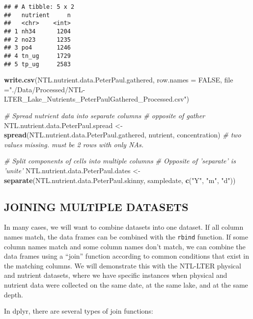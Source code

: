 \documentclass[]{article}
\newenvironment{Shaded}{\begin{snugshade}}{\end{snugshade}}
\newcommand{\KeywordTok}[1]{\textcolor[rgb]{0.13,0.29,0.53}{\textbf{#1}}}
\newcommand{\DataTypeTok}[1]{\textcolor[rgb]{0.13,0.29,0.53}{#1}}
\newcommand{\StringTok}[1]{\textcolor[rgb]{0.31,0.60,0.02}{#1}}
\newcommand{\CommentTok}[1]{\textcolor[rgb]{0.56,0.35,0.01}{\textit{#1}}}
\newcommand{\OtherTok}[1]{\textcolor[rgb]{0.56,0.35,0.01}{#1}}
\newcommand{\NormalTok}[1]{#1}
\begin{document}
\begin{verbatim}
## # A tibble: 5 x 2
##   nutrient     n
##   <chr>    <int>
## 1 nh34      1204
## 2 no23      1235
## 3 po4       1246
## 4 tn_ug     1729
## 5 tp_ug     2583
\end{verbatim}

\begin{Shaded}
\begin{Highlighting}[]
\KeywordTok{write.csv}\NormalTok{(NTL.nutrient.data.PeterPaul.gathered, }\DataTypeTok{row.names =} \OtherTok{FALSE}\NormalTok{, }
          \DataTypeTok{file =}\StringTok{"./Data/Processed/NTL-LTER_Lake_Nutrients_PeterPaulGathered_Processed.csv"}\NormalTok{)}

\CommentTok{# Spread nutrient data into separate columns   # opposite of gather}
\NormalTok{NTL.nutrient.data.PeterPaul.spread <-}\StringTok{ }\KeywordTok{spread}\NormalTok{(NTL.nutrient.data.PeterPaul.gathered, nutrient, concentration) }\CommentTok{# two values missing. must be 2 rows with only NAs.}

\CommentTok{# Split components of cells into multiple columns}
\CommentTok{# Opposite of 'separate' is 'unite'}
\NormalTok{NTL.nutrient.data.PeterPaul.dates <-}\StringTok{ }\KeywordTok{separate}\NormalTok{(NTL.nutrient.data.PeterPaul.skinny, sampledate, }\KeywordTok{c}\NormalTok{(}\StringTok{"Y"}\NormalTok{, }\StringTok{"m"}\NormalTok{, }\StringTok{"d"}\NormalTok{))}
\end{Highlighting}
\end{Shaded}

\subsection{JOINING MULTIPLE DATASETS}\label{joining-multiple-datasets}

In many cases, we will want to combine datasets into one dataset. If all
column names match, the data frames can be combined with the
\texttt{rbind} function. If some column names match and some column
names don't match, we can combine the data frames using a ``join''
function according to common conditions that exist in the matching
columns. We will demonstrate this with the NTL-LTER physical and
nutrient datasets, where we have specific instances when physical and
nutrient data were collected on the same date, at the same lake, and at
the same depth.

In dplyr, there are several types of join functions:
\end{document}
